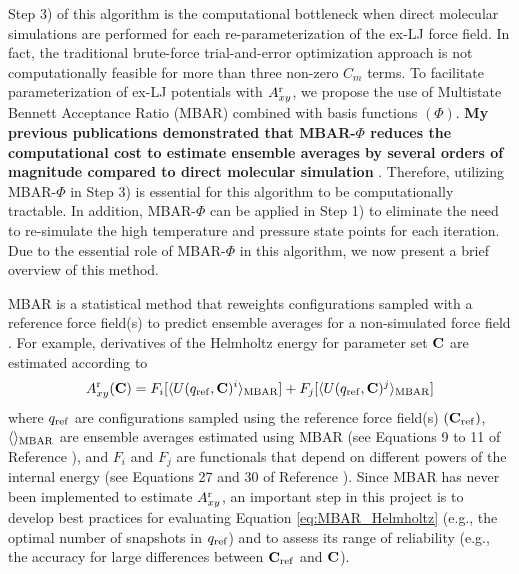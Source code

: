 \documentclass[12pt,a4paper]{article}
\newcommand{\bfm}[1]{{\bf #1}}
\newcommand{\C}{\bfm{C}}
\begin{document}


Step 3) of this algorithm is the computational bottleneck when direct molecular simulations are performed for each re-parameterization of the ex-LJ force field. In fact, the traditional brute-force trial-and-error optimization approach is not computationally feasible for more than three non-zero $C_m$ terms. To facilitate parameterization of ex-LJ potentials with $A_{xy}^{\rm r}$, we propose the use of Multistate Bennett Acceptance Ratio (MBAR) combined with basis functions $(\Phi)$. \textbf{My previous publications demonstrated that MBAR-$\Phi$ reduces the computational cost to estimate ensemble averages by several orders of magnitude compared to direct molecular simulation} \cite{Messerly2018_1,Messerly2018_2}. Therefore, utilizing MBAR-$\Phi$ in Step 3) is essential for this algorithm to be computationally tractable. In addition, MBAR-$\Phi$ can be applied in Step 1) to eliminate the need to re-simulate the high temperature and pressure state points for each iteration. Due to the essential role of MBAR-$\Phi$ in this algorithm, we now present a brief overview of this method. 


MBAR is a statistical method that reweights configurations sampled with a reference force field(s) to predict ensemble averages for a non-simulated force field \cite{shirts-chodera:jcp:2008:mbar,Messerly2018_1}. For example, derivatives of the Helmholtz energy for parameter set $\C$ are estimated according to 
\begin{equation} \label{eq:MBAR_Helmholtz}
A_{xy}^{\rm r}(\C) = F_i[\langle U(q_{\rm ref},\C)^i \rangle_{\rm MBAR}] + F_j[\langle U(q_{\rm ref},\C)^j \rangle_{\rm MBAR}]
\end{equation}
where $q_{\rm ref}$ are configurations sampled using the reference force field(s) $(\C_{\rm ref})$, $\langle\rangle_{\rm MBAR}$ are ensemble averages estimated using MBAR (see Equations 9 to 11 of Reference ), and $F_i$ and $F_j$ are functionals that depend on different powers of the internal energy (see Equations 27 and 30 of Reference ). Since MBAR has never been implemented to estimate $A_{xy}^{\rm r}$, an important step in this project is to develop best practices for evaluating Equation \ref{eq:MBAR_Helmholtz} (e.g., the optimal number of snapshots in $q_{\rm ref}$) and to assess its range of reliability (e.g., the accuracy for large differences between $\C_{\rm ref}$ and $\C$). 
\end{document}

